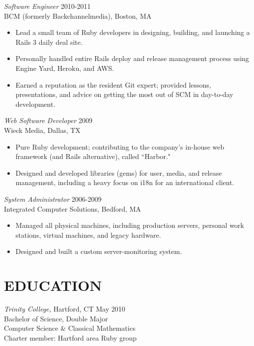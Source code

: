 \documentclass[line,margin]{res}
\begin{document}
\begin{resume}
  {\sl Software Engineer}  \hfill 2010-2011 \\
  BCM (formerly Backchannelmedia),
  Boston, MA
  \begin{itemize}  \itemsep -2pt %
    \item Lead a small team of Ruby developers in designing, building, and launching a Rails 3 daily deal site.
    \item Personally handled entire Rails deploy and release management process using Engine Yard, Heroku, and AWS.
    \item Earned a reputation as the resident Git expert; provided lessons, presentations, and advice on getting the most out of SCM in day-to-day development.
  \end{itemize}

  {\sl Web Software Developer}  \hfill 2009 \\
  Wieck Media,
  Dallas, TX
  \begin{itemize}  \itemsep -2pt %
    \item Pure Ruby development; contributing to the company's in-house web framework (and Rails alternative), called ``Harbor."
    \item Designed and developed libraries (gems) for user, media, and release management, including a heavy focus on i18n for an international client.
  \end{itemize}

  {\sl System Administrator}  \hfill 2006-2009 \\
  Integrated Computer Solutions,
  Bedford, MA
  \begin{itemize}  \itemsep -2pt %
       \item Managed all physical machines, including production servers, personal work stations, virtual machines, and legacy hardware.
       \item Designed and built a custom server-monitoring system.
  \end{itemize}

\section{EDUCATION}
  {\sl Trinity College,}
  Hartford, CT \hfill May 2010 \\
  Bachelor of Science, Double Major \\
  Computer Science \& Classical Mathematics \\
  Charter member: Hartford area Ruby group


\end{resume}
\end{document}
